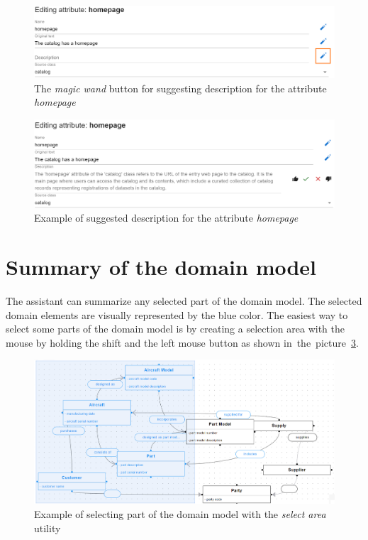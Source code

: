 \begin{figure}[!h]
    \includegraphics[scale=0.31]{../docs/images/frontend/suggest-single-field.png}
    \caption{\centering The \textit{magic wand} button for suggesting description for the attribute \textit{homepage}}
    \label{fig:suggest_single_field}
\end{figure}

\begin{figure}[!h]
    \includegraphics[scale=0.31]{../docs/images/frontend/suggested-single-field.png}
    \caption{\centering Example of suggested description for the attribute \textit{homepage}}
    \label{fig:suggested_single_field}
\end{figure}


\section{Summary of the domain model}

The assistant can summarize any selected part of the domain model. The selected domain elements are visually represented by the blue color. The easiest way to select some parts of the domain model is by creating a selection area with the mouse by holding the shift and the left mouse button as shown in~the~picture~\ref{fig:selection}.

\begin{figure}[!h]
    \includegraphics[scale=0.33]{../docs/images/frontend/selection.png}
    \caption{\centering Example of selecting part of the domain model with the \textit{select area} utility}
    \label{fig:selection}
\end{figure}

